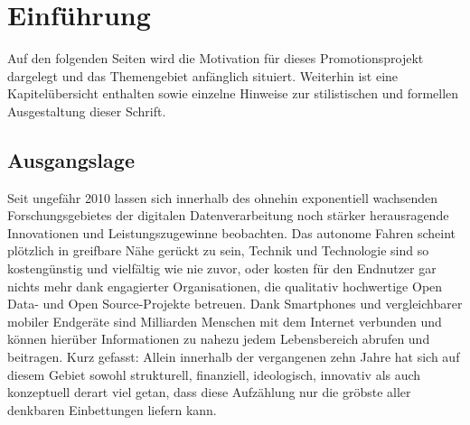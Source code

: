 \chapter{Einführung} %

\label{K1} %





Auf den folgenden Seiten wird die Motivation für dieses Promotionsprojekt dargelegt und das Themengebiet anfänglich situiert. Weiterhin ist eine Kapitelübersicht enthalten sowie einzelne Hinweise zur stilistischen und formellen Ausgestaltung dieser Schrift.



\section{Ausgangslage}
\label{K1:sec:ausgangslage}\largerpage


Seit ungefähr 2010 lassen sich innerhalb des ohnehin exponentiell wachsenden Forschungsgebietes der digitalen Datenverarbeitung noch stärker herausragende Innovationen und Leistungszugewinne beobachten. Das autonome Fahren scheint plötzlich in greifbare Nähe gerückt zu sein, Technik und Technologie sind so kostengünstig und vielfältig wie nie zuvor, oder kosten für den Endnutzer gar nichts mehr dank engagierter Organisationen, die qualitativ hochwertige Open Data- und Open Source-Projekte betreuen. Dank Smartphones und vergleichbarer mobiler Endgeräte sind Milliarden Menschen mit dem Internet verbunden und können hierüber Informationen zu nahezu jedem Lebensbereich abrufen und beitragen. Kurz gefasst: Allein innerhalb der vergangenen zehn Jahre hat sich auf diesem Gebiet sowohl strukturell, finanziell, ideologisch, innovativ als auch konzeptuell derart viel getan, dass diese Aufzählung nur die gröbste aller denkbaren Einbettungen liefern kann.

